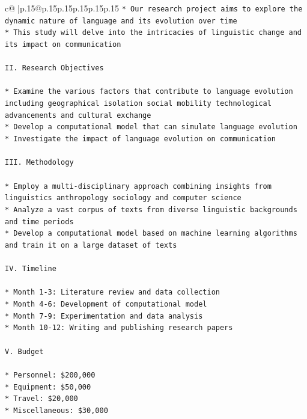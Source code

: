 \documentclass{article}
\begin{document}
{\begin{supertabular}{c@{$\;$}|p{.15\linewidth}@{}p{.15\linewidth}p{.15\linewidth}p{.15\linewidth}p{.15\linewidth}p{.15\linewidth}}
{{{\texttt{* Our research project aims to explore the dynamic nature of language and its evolution over time} \\
\texttt{* This study will delve into the intricacies of linguistic change and its impact on communication} \\
\\ 
\texttt{II. Research Objectives} \\
\\ 
\texttt{* Examine the various factors that contribute to language evolution including geographical isolation social mobility technological advancements and cultural exchange} \\
\texttt{* Develop a computational model that can simulate language evolution} \\
\texttt{* Investigate the impact of language evolution on communication} \\
\\ 
\texttt{III. Methodology} \\
\\ 
\texttt{* Employ a multi{-}disciplinary approach combining insights from linguistics anthropology sociology and computer science} \\
\texttt{* Analyze a vast corpus of texts from diverse linguistic backgrounds and time periods} \\
\texttt{* Develop a computational model based on machine learning algorithms and train it on a large dataset of texts} \\
\\ 
\texttt{IV. Timeline} \\
\\ 
\texttt{* Month 1{-}3: Literature review and data collection} \\
\texttt{* Month 4{-}6: Development of computational model} \\
\texttt{* Month 7{-}9: Experimentation and data analysis} \\
\texttt{* Month 10{-}12: Writing and publishing research papers} \\
\\ 
\texttt{V. Budget} \\
\\ 
\texttt{* Personnel: \$200,000} \\
\texttt{* Equipment: \$50,000} \\
\texttt{* Travel: \$20,000} \\
\texttt{* Miscellaneous: \$30,000} \\
\\ 
}}}
\end{supertabular}}
\end{document}
